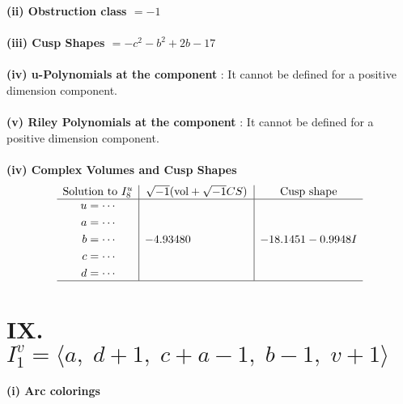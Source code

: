 \documentclass[1p]{elsarticle_modified}
\theoremstyle{definition}
\newcommand{\I}{\sqrt{-1}}
\begin{document}
\flushleft \textbf{(ii) Obstruction class $= -1$}\\~\\
\flushleft \textbf{(iii) Cusp Shapes $= - c^2- b^2+2 b-17$}\\~\\
\flushleft \textbf{(iv) u-Polynomials at the component} : It cannot be defined for a positive dimension component.\\~\\
\flushleft \textbf{(v) Riley Polynomials at the component} : It cannot be defined for a positive dimension component.\\~\\
\newpage\flushleft \textbf{(iv) Complex Volumes and Cusp Shapes}
$$\begin{array}{c|c|c} 
\text{Solution to }I^u_{8}& \I (\text{vol} + \sqrt{-1}CS) & \text{Cusp shape}\\
 \hline 
\begin{aligned}
u &= \cdots \\
a &= \cdots \\
b &= \cdots \\
c &= \cdots \\
d &= \cdots\end{aligned}
 & -4.93480\phantom{ +0.000000I} & -18.1451 - 0.9948 I\\
 \hline 
 \end{array}
$$\newpage\renewcommand{\arraystretch}{1}
\centering \section*{IX. $I^v_{1}= \langle a,\;d+1,\;c+a-1,\;b-1,\;v+1 \rangle$}
\flushleft \textbf{(i) Arc colorings}\\
\end{document}
